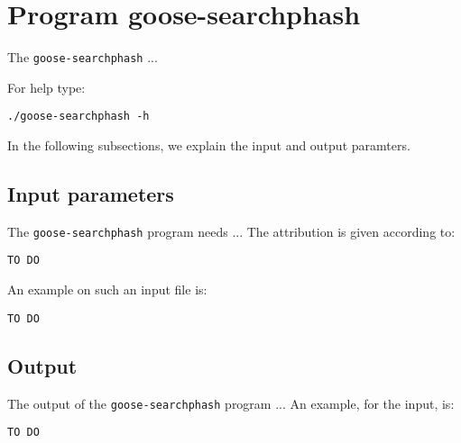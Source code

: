 \section{Program goose-searchphash}
The \texttt{goose-searchphash} ...

For help type:
\begin{lstlisting}
./goose-searchphash -h
\end{lstlisting}
In the following subsections, we explain the input and output paramters.

\subsection*{Input parameters}

The \texttt{goose-searchphash} program needs ...
The attribution is given according to:
\begin{lstlisting}
TO DO
\end{lstlisting}

An example on such an input file is:
\begin{lstlisting}
TO DO
\end{lstlisting}

\subsection*{Output}
The output of the \texttt{goose-searchphash} program ...
An example, for the input, is:
\begin{lstlisting}
TO DO
\end{lstlisting}

